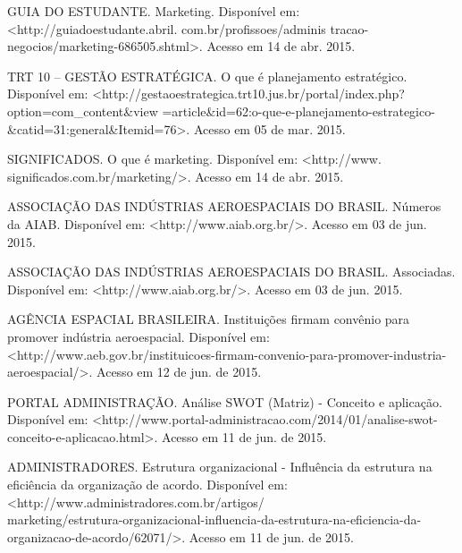 \documentclass[
	12pt,				%
	openright,			%
	oneside,			%
	a4paper,			%
	english,			%
	french,				%
	spanish,			%
	brazil				%
	]{abntex2}
\begin{document}
	GUIA DO ESTUDANTE. Marketing. Disponível em: <http://guiadoestudante.abril. com.br/profissoes/adminis tracao-negocios/marketing-686505.shtml>. Acesso em 14 de abr. 2015.
	
	TRT 10 – GESTÃO ESTRATÉGICA. O que é planejamento estratégico. Disponível em: <http://gestaoestrategica.trt10.jus.br/portal/index.php?option=com\_content\&view =article\&id=62:o-que-e-planejamento-estrategico-\&catid=31:general\&Itemid=76>. Acesso em 05 de mar. 2015.
	
	SIGNIFICADOS. O que é marketing. Disponível em: <http://www. significados.com.br/marketing/>. Acesso em 14 de abr. 2015.

	ASSOCIAÇÃO DAS INDÚSTRIAS AEROESPACIAIS DO BRASIL. Números da AIAB. Disponível em: <http://www.aiab.org.br/>. Acesso em 03 de jun. 2015.
	
	ASSOCIAÇÃO DAS INDÚSTRIAS AEROESPACIAIS DO BRASIL. Associadas. Disponível em: <http://www.aiab.org.br/>. Acesso em 03 de jun. 2015.
	
	AGÊNCIA ESPACIAL BRASILEIRA. Instituições firmam convênio para promover indústria aeroespacial. Disponível em: <http://www.aeb.gov.br/instituicoes-firmam-convenio-para-promover-industria-aeroespacial/>. Acesso em 12 de jun. de 2015.
	
	PORTAL ADMINISTRAÇÃO. Análise SWOT (Matriz) - Conceito e aplicação. Disponível em: <http://www.portal-administracao.com/2014/01/analise-swot-conceito-e-aplicacao.html>. Acesso em 11 de jun. de 2015.

	ADMINISTRADORES. Estrutura organizacional - Influência da estrutura na eficiência da organização de acordo. Disponível em: <http://www.administradores.com.br/artigos/\\marketing/estrutura-organizacional-influencia-da-estrutura-na-eficiencia-da-organizacao-de-acordo/62071/>. Acesso em 11 de jun. de 2015.

\end{document}
